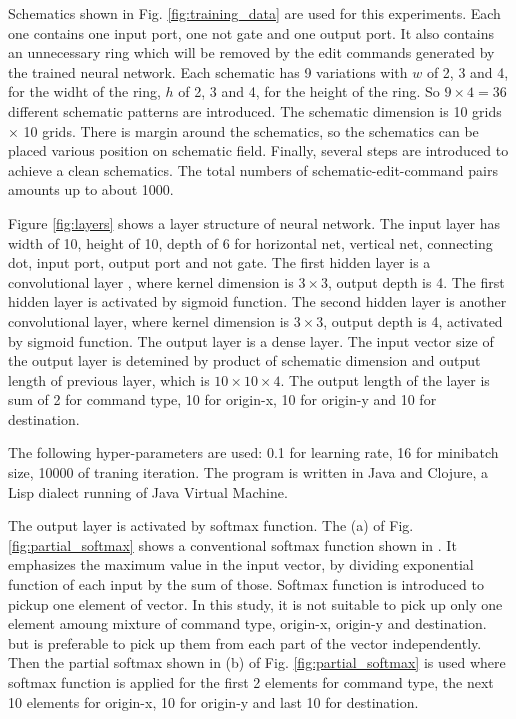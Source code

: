 \documentclass[twocolumn]{article}
\begin{document}
Schematics shown in Fig. \ref{fig:training_data} are used for this experiments.
Each one contains one input port, one not gate and one output port.
It also contains an unnecessary ring which will be removed
by the edit commands generated by the trained neural network.
Each schematic has 9 variations with
$w$ of 2, 3 and 4, for the widht of the ring,
$h$ of 2, 3 and 4, for the height of the ring.
So $9 \times 4 = 36$ different schematic patterns are introduced.
The schematic dimension is 10 grids $\times$ 10 grids.
There is margin around the schematics,
so the schematics can be placed various position on schematic field.
Finally, several steps are introduced to achieve a clean schematics.
The total numbers of schematic-edit-command pairs amounts up to about 1000.

Figure \ref{fig:layers} shows a layer structure of neural network.
The input layer has width of 10, height of 10,
depth of 6 for horizontal net, vertical net, connecting dot, input port,
output port and not gate.
The first hidden layer is a convolutional layer \cite{mit},
where kernel dimension is $3\times 3$, output depth is 4.
The first hidden layer is activated by sigmoid function.
The second hidden layer is another convolutional layer,
where kernel dimension is $3\times 3$, output depth is 4,
activated by sigmoid function.
The output layer is a dense layer.
The input vector size of the output layer
is detemined by product of schematic dimension
and output length of previous layer, which is $10 \times 10 \times 4$.
The output length of the layer is sum of 2 for command type,
10 for origin-x, 10 for origin-y and 10 for destination.

The following hyper-parameters are used:
0.1 for learning rate, 16 for minibatch size, 10000 of traning iteration.
The program is written in Java and Clojure,
a Lisp dialect running of Java Virtual Machine.

The output layer is activated by softmax function.
The (a) of Fig. \ref{fig:partial_softmax} shows a conventional softmax
function shown in \cite{mit}.
It emphasizes the maximum value in the input vector,
by dividing exponential function of each input by the sum of those.
Softmax function is introduced to pickup one element of vector.
In this study, it is not suitable to pick up only one element
amoung mixture of command type, origin-x, origin-y and destination.
but is preferable to pick up them from each part of the vector independently.
Then the partial softmax shown in (b) of Fig. \ref{fig:partial_softmax}
is used where softmax function is applied
for the first 2 elements for command type,
the next 10 elements for origin-x, 10 for origin-y and last 10 for destination.
\end{document}
